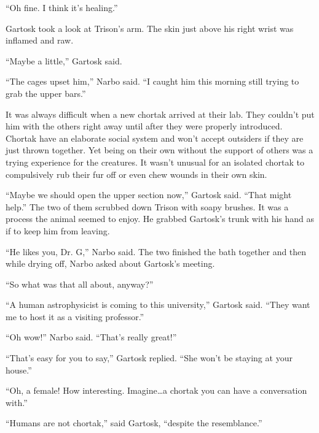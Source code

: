``Oh fine. I think it's healing.''

Gartosk took a look at Trison's arm. The skin just above his right wrist was inflamed and
raw.

``Maybe a little,'' Gartosk said.

``The cages upset him,'' Narbo said. ``I caught him this morning still trying to grab the
upper bars.''

It was always difficult when a new chortak arrived at their lab. They couldn't put him with
the others right away until after they were properly introduced. Chortak have an elaborate
social system and won't accept outsiders if they are just thrown together. Yet being on their
own without the support of others was a trying experience for the creatures. It wasn't
unusual for an isolated chortak to compulsively rub their fur off or even chew wounds in their
own skin.

``Maybe we should open the upper section now,'' Gartosk said. ``That might help.'' The
two of them scrubbed down Trison with soapy brushes. It was a process the animal seemed to
enjoy. He grabbed Gartosk's trunk with his hand as if to keep him from leaving.

``He likes you, Dr. G,'' Narbo said. The two finished the bath together and then while
drying off, Narbo asked about Gartosk's meeting.

``So what was that all about, anyway?''

``A human astrophysicist is coming to this university,'' Gartosk said. ``They want me to
host it as a visiting professor.''

``Oh wow!'' Narbo said. ``That's really great!''

``That's easy for you to say,'' Gartosk replied. ``She won't be staying at your
house.''

``Oh, a female! How interesting. Imagine\ldots a chortak you can have a conversation with.''

``Humans are not chortak,'' said Gartosk, ``despite the resemblance.''

